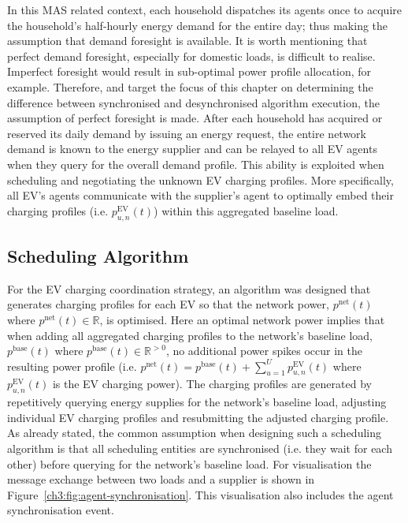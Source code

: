 In this MAS related context, each household dispatches its agents once to acquire the household's half-hourly energy demand for the entire day; thus making the assumption that demand foresight is available.
It is worth mentioning that perfect demand foresight, especially for domestic loads, is difficult to realise.
Imperfect foresight would result in sub-optimal power profile allocation, for example.
Therefore, and target the focus of this chapter on determining the difference between synchronised and desynchronised algorithm execution, the assumption of perfect foresight is made.
After each household has acquired or reserved its daily demand by issuing an energy request, the entire network demand is known to the energy supplier and can be relayed to all EV agents when they query for the overall demand profile.
This ability is exploited when scheduling and negotiating the unknown EV charging profiles.
More specifically, all EV's agents communicate with the supplier's agent to optimally embed their charging profiles (i.e. $p^\text{EV}_{u,n}(t)$) within this aggregated baseline load.

\subsection{Scheduling Algorithm}
\label{ch3:subsec:scheduling-algorithm}

For the EV charging coordination strategy, an algorithm was designed that generates charging profiles for each EV so that the network power, $p^\text{net}(t)$ where $p^\text{net}(t) \in \mathbb{R}$, is optimised.
Here an optimal network power implies that when adding all aggregated charging profiles to the network's baseline load, $p^\text{base}(t)$  where $p^\text{base}(t) \in \mathbb{R}^{>0}$, no additional power spikes occur in the resulting power profile (i.e. $p^\text{net}(t) = p^\text{base}(t) + \sum_{u=1}^U p^\text{EV}_{u,n}(t)$ where $p^\text{EV}_{u,n}(t)$ is the EV charging power).
The charging profiles are generated by repetitively querying energy supplies for the network's baseline load, adjusting individual EV charging profiles and resubmitting the adjusted charging profile.
As already stated, the common assumption when designing such a scheduling algorithm is that all scheduling entities are synchronised (i.e. they wait for each other) before querying for the network's baseline load.
For visualisation the message exchange between two loads and a supplier is shown in Figure~\ref{ch3:fig:agent-synchronisation}.
This visualisation also includes the agent synchronisation event.

